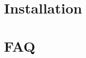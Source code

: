 \documentclass[11pt,a4paper]{article}
\begin{document}
 \makeindex
 \section{Installation}
 \section{FAQ}
 
\end{document}
